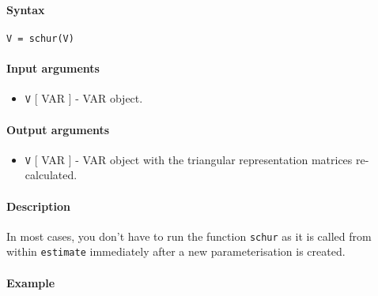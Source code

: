 


	\paragraph{Syntax}\label{syntax}

\begin{verbatim}
V = schur(V)
\end{verbatim}

\paragraph{Input arguments}\label{input-arguments}

\begin{itemize}
\itemsep1pt\parskip0pt
\item
  \texttt{V} {[} VAR {]} - VAR object.
\end{itemize}

\paragraph{Output arguments}\label{output-arguments}

\begin{itemize}
\itemsep1pt\parskip0pt
\item
  \texttt{V} {[} VAR {]} - VAR object with the triangular representation
  matrices re-calculated.
\end{itemize}

\paragraph{Description}\label{description}

In most cases, you don't have to run the function \texttt{schur} as it
is called from within \texttt{estimate} immediately after a new
parameterisation is created.

\paragraph{Example}\label{example}


